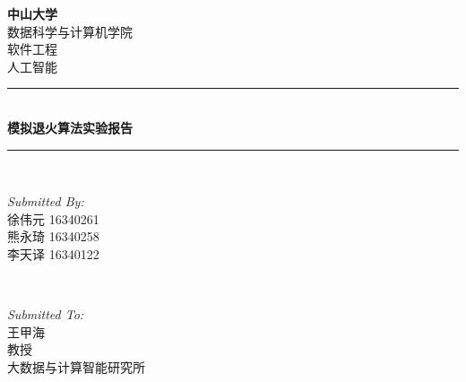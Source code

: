 \begin{titlepage}

\newcommand{\HRule}{\rule{\linewidth}{0.5mm}} %

\center %
 

\textsc{\LARGE \bfseries 中山大学 }\\[0.3cm] %
\textsc{\Large 数据科学与计算机学院}\\[0.5cm] %
\textsc{\Large 软件工程}\\[0.3cm] %
\textsc{\Large 人工智能}\\[0.5cm]


\HRule \\[0.4cm]
{ \huge \bfseries 模拟退火算法实验报告}\\[0.03cm] %
\HRule \\[1.5cm]

 

\begin{minipage}{0.4\textwidth}
\begin{flushleft} \large
\emph{Submitted By:}\\
徐伟元 16340261\\
熊永琦 16340258\\
李天译 16340122
\end{flushleft}
\end{minipage}
~
\begin{minipage}{0.5\textwidth}
\begin{flushright} \large
\emph{Submitted To:} \\
王甲海\\ 教授\\ 大数据与计算智能研究所 %
\end{flushright}
\end{minipage}\\[1cm]


\end{titlepage}

